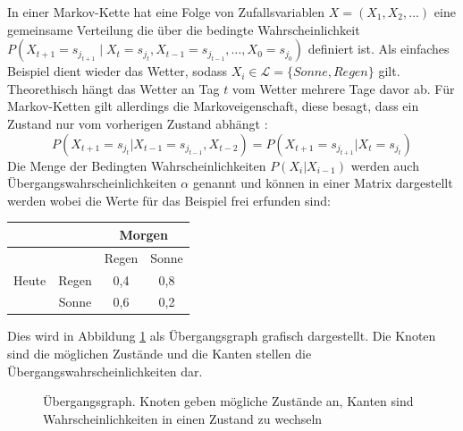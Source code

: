 \documentclass[12pt]{article}
\begin{document}
In einer Markov-Kette hat eine Folge von Zufallsvariablen $X=(X_1,X_2,...)$ eine gemeinsame Verteilung die über die bedingte Wahrscheinlichkeit $P(X_{t+1}=s_{j_{t+1}}\mid X_t=s_{j_t}, X_{t-1}=s_{j_{t-1}},\dots,X_0=s_{j_0})$ definiert ist. Als einfaches Beispiel dient wieder das Wetter, sodass $X_i \in \mathcal{L} = \{Sonne, Regen\}$ gilt. Theorethisch hängt das Wetter an Tag $t$ vom Wetter mehrere Tage davor ab. Für Markov-Ketten gilt allerdings die Markoveigenschaft, diese besagt, dass ein Zustand nur vom vorherigen Zustand abhängt \cite{Markovchains}:
\begin{equation}
P(X_{t+1}=s_{j_t}|X_{t-1}=s_{j_{t-1}},X_{t-2})=P(X_{t+1}=s_{j_{t+1}} | X_t=s_{j_{t}})
\end{equation}
\newpage
Die Menge der Bedingten Wahrscheinlichkeiten $P(X_i|X_{i-1})$ werden auch Übergangswahrscheinlichkeiten $\alpha$ genannt und können in einer Matrix dargestellt werden wobei die Werte für das Beispiel frei erfunden sind:
\begin{table}[H]
\begin{center}
\begin{tabular}{c|c|c|c}
	&&\multicolumn{2}{c}{Morgen}\\\hline
	&&Regen&Sonne\\\cline{2-4}
	Heute&Regen& 0,4 & 0,8\\\cline{2-4}
	&Sonne&0,6&0,2\\
\end{tabular}
\end{center}
\end{table}

Dies wird in Abbildung \ref{Markovc} als Übergangsgraph grafisch dargestellt. Die Knoten sind die möglichen Zustände und die Kanten stellen die Übergangswahrscheinlichkeiten dar.

\begin{figure}[H]
\begin{center}
	\end{center}
	\caption{Übergangsgraph. Knoten geben mögliche Zustände an, Kanten sind Wahrscheinlichkeiten in einen Zustand zu wechseln}
	\label{Markovc}
\end{figure}
\end{document}
